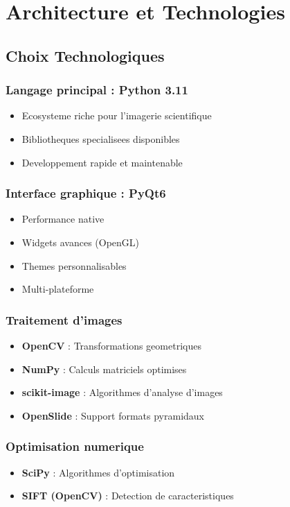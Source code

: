 \documentclass[12pt,a4paper]{article}
\begin{document}
\section{Architecture et Technologies}

\subsection{Choix Technologiques}

\subsubsection{Langage principal : Python 3.11}
\begin{itemize}
\item Ecosysteme riche pour l'imagerie scientifique
\item Bibliotheques specialisees disponibles
\item Developpement rapide et maintenable
\end{itemize}

\subsubsection{Interface graphique : PyQt6}
\begin{itemize}
\item Performance native
\item Widgets avances (OpenGL)
\item Themes personnalisables
\item Multi-plateforme
\end{itemize}

\subsubsection{Traitement d'images}
\begin{itemize}
\item \textbf{OpenCV} : Transformations geometriques
\item \textbf{NumPy} : Calculs matriciels optimises
\item \textbf{scikit-image} : Algorithmes d'analyse d'images
\item \textbf{OpenSlide} : Support formats pyramidaux
\end{itemize}

\subsubsection{Optimisation numerique}
\begin{itemize}
\item \textbf{SciPy} : Algorithmes d'optimisation
\item \textbf{SIFT (OpenCV)} : Detection de caracteristiques
\end{itemize}
\end{document}
